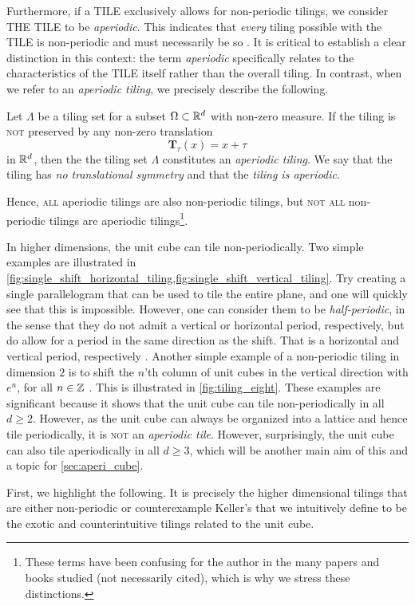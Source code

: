 \documentclass[../thesis.tex]{subfiles}
\begin{document}
Furthermore, if a \textsc{TILE} exclusively allows for non-periodic tilings, we consider \textsc{THE TILE} to be \emph{aperiodic}. This indicates that \emph{every} tiling possible with the \textsc{TILE} is non-periodic and must necessarily be so \cite[p. 520]{grunbaumTilingsPatterns1987}. It is critical to establish a clear distinction in this context: the term \emph{aperiodic} specifically relates to the characteristics of the \textsc{TILE} itself rather than the overall tiling. In contrast, when we refer to an \emph{aperiodic tiling}, we precisely describe the following.
\begin{definition}
    Let $\Lambda$ be a tiling set for a subset $\Omega\subset \mathbb{R}^d$ with non-zero measure. If the tiling is \textsc{not} preserved by any non-zero translation 
    \begin{equation*}
        \mathbf{T}_\tau (x) = x+\tau 
    \end{equation*}
    in $\mathbb{R}^d$, then the the tiling set $\Lambda$ constitutes an \emph{aperiodic tiling}. We say that the tiling has \emph{no translational symmetry} and that the \emph{tiling is aperiodic}.
\end{definition}
Hence, \textsc{all} aperiodic tilings are also non-periodic tilings, but \textsc{not all} non-periodic tilings are aperiodic tilings\footnote[1]{These terms have been confusing for the author in the many papers and books studied (not necessarily cited), which is why we stress these distinctions.}.

In higher dimensions, the unit cube can tile non-periodically. Two simple examples are illustrated in \cref{fig:single_shift_horizontal_tiling,fig:single_shift_vertical_tiling}. Try creating a single parallelogram that can be used to tile the entire plane, and one will quickly see that this is impossible. However, one can consider them to be \emph{half-periodic}, in the sense that they do not admit a vertical or horizontal period, respectively, but do allow for a period in the same direction as the shift. That is a horizontal and vertical period, respectively \cite{kolountzakisTilingsTranslation2010}. Another simple example of a non-periodic tiling in dimension $2$ is to shift the $n$'th column  of unit cubes in the vertical  direction with $e^n$, for all $n\in\mathbb{Z}$ \cite{liuUniformityNonUniformGabor2003}. This is illustrated in \cref{fig:tiling_eight}. These examples are significant because it shows that the unit cube can tile non-periodically in all $d\geq 2$. However, as the unit cube can always be organized into a lattice and hence tile periodically, it is \textsc{not} an \emph{aperiodic tile}. However, surprisingly, the unit cube can also tile aperiodically in all $d\geq 3$, which will be another main aim of this  and a topic for \cref{sec:aperi_cube}.

First, we highlight the following. It is precisely the higher dimensional tilings that are either non-periodic or counterexample Keller's  that we intuitively define to be the exotic and counterintuitive tilings related to the unit cube.
\end{document}
